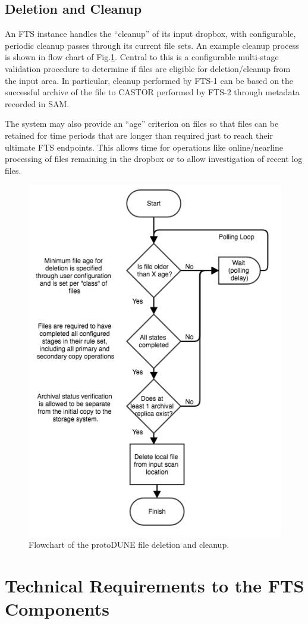 \documentclass[12pt]{article}
\newcommand{\pd}{protoDUNE\xspace}
\begin{document}
\subsection{Deletion and Cleanup}
\label{sec:cleanup}

An FTS instance handles the ``cleanup'' of its input dropbox, with
configurable, periodic cleanup passes through its current file sets.
An example cleanup process is shown in flow chart of
Fig.\ref{fig:ftscleanup}.  Central to this is a configurable
multi-stage validation procedure to determine if files are eligible
for deletion/cleanup from the input area.  In particular, cleanup
performed by FTS-1 can be based on the successful archive of the file
to CASTOR performed by FTS-2 through metadata recorded in SAM.

The system may also provide an ``age'' criterion on files so that
files can be retained for time periods that are longer than required
just to reach their ultimate FTS endpoints.  This allows time for
operations like online/nearline processing of files remaining in the
dropbox or to allow investigation of recent log files.


\begin{figure}[tbh]
  \centering
  \includegraphics[width=0.55\linewidth]{figures/fts_file_deletion_flowchart.png}  
  \caption{Flowchart of the \pd file deletion and cleanup.}
  \label{fig:ftscleanup}
\end{figure}


 
\section{Technical Requirements to the FTS Components}
\end{document}

